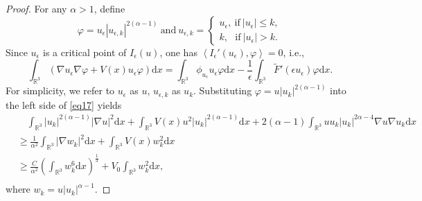 \documentclass[12pt]{amsart}
\numberwithin{equation}{section}
\theoremstyle{definition}
\begin{document}
\begin{proof}
        For any $\alpha > 1$, define
		\begin{equation*}
			\varphi =u_{\epsilon }\left|u_{\epsilon ,k} \right|^{2\left ( \alpha -1 \right )}~\text{and}~u _{\epsilon,k}=
			\begin{cases}
				u _{\epsilon },~\text{if}~\left|u _{\epsilon } \right|\leq k,\\
				k,\ ~~\text{if}~\left|u _{\epsilon } \right|> k.
			\end{cases}
		\end{equation*}
		Since $u_{\epsilon}$ is a critical point of $I_{\epsilon}\left ( u \right )$, one has $\left<I_{\epsilon}'\left (u_{\epsilon}  \right ) ,\varphi \right>=0$, i.e.,
		\begin{equation} \label{eq17}
			\int_{\mathbb{R}^{3}}\left(\nabla u_{\epsilon }\nabla \varphi+V(x)u _{\epsilon }\varphi\right) \text{d}x=\int_{\mathbb{R}^{3}}\phi _{u _{\epsilon}} u_{\epsilon} \varphi \text{d}x-\frac{1}{\epsilon }\int_{\mathbb{R}^{3}}\widetilde{F}'\left ( \epsilon u_{\epsilon} \right )\varphi \text{d}x.
		\end{equation}
		For simplicity, we  refer to $u_{\epsilon}$ as $u$, $u_{\epsilon ,k}$ as $u_{k} $. Substituting $\varphi =u\left|u_{k} \right|^{2\left ( \alpha -1 \right )}$ into the left side of \eqref{eq17} yields
		\begin{equation*}
			\begin{aligned}
				&\quad \int_{\mathbb{R}^{3}}\left|u_{k} \right|^{2\left ( \alpha -1 \right )} \left|\nabla u\right|^{2}\text{d}x+\int_{\mathbb{R}^{3}}V(x) u^{2}\left| u_{k}\right|^{2\left ( \alpha -1 \right )}\text{d}x+2\left ( \alpha -1 \right )\int_{\mathbb{R}^{3}}uu_{k} \left| u_{k}\right|^{2\alpha -4}\nabla u \nabla u_{k}\text{d}x\\
				&\geq \frac{1}{\alpha ^{2}}\int_{\mathbb{R}^{3}}\left|\nabla w_{k}\right|^{2}\text{d}x+\int_{\mathbb{R}^{3}}V(x) w_{k}^{2}\text{d}x\\
				&\geq \frac{C}{\alpha ^{2}}\left ( \int_{\mathbb{R}^{3}}w_{k}^{6}\text{d}x\right )^{\frac{1}{3}}+V_0\int_{\mathbb{R}^{3}}w_{k}^{2}\text{d}x,\\
			\end{aligned}
		\end{equation*}
		where $w _{k}=u \left|u _{k}\right|^{\alpha -1}$.
		

\end{proof}
\end{document}
